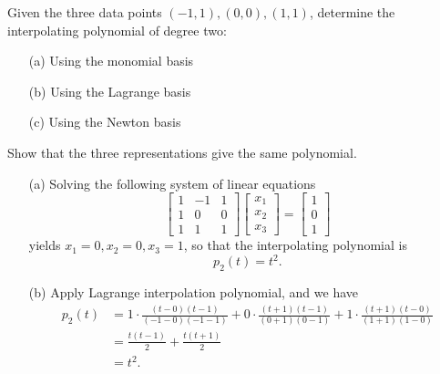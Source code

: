 \begin{pro}
  Given the three data points $(-1, 1), (0, 0), (1, 1)$,
  determine the interpolating polynomial of degree two:
  \begin{itemize}
  \item[(a)]
    Using the monomial basis

  \item[(b)]
    Using the Lagrange basis

  \item[(c)]
    Using the Newton basis
  \end{itemize}
  Show that the three representations give the same polynomial.
\end{pro}
\begin{sol}
  \begin{itemize}
  \item[(a)]
    Solving the following system of linear equations
    \begin{displaymath}
      \begin{bmatrix}
        1 & -1 & 1 \\
        1 & 0 & 0 \\
        1 & 1 & 1
      \end{bmatrix}
      \begin{bmatrix}
        x_1 \\
        x_2 \\
        x_3
      \end{bmatrix}
      =
      \begin{bmatrix}
        1 \\
        0 \\
        1
      \end{bmatrix}
    \end{displaymath}
    yields $x_1 = 0, x_2 = 0, x_3 = 1$,
    so that the interpolating polynomial is
    \begin{displaymath}
      p_2(t) = t^2.
    \end{displaymath}

  \item[(b)]
    Apply Lagrange interpolation polynomial, and we have
    \begin{align*}
      p_2(t) &= 1\cdot \frac{(t-0)(t-1)}{(-1-0)(-1-1)}
      + 0\cdot \frac{(t+1)(t-1)}{(0+1)(0-1)}
               + 1\cdot \frac{(t+1)(t-0)}{(1+1)(1-0)} \\
             &= \frac{t(t-1)}{2} + \frac{t(t+1)}{2} \\
      &= t^2.
    \end{align*}


\end{itemize}
\end{sol}
